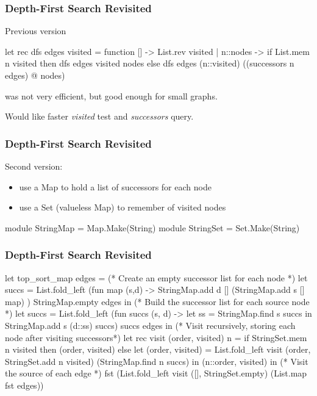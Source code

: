 \documentclass{plt}
\begin{document}
\begin{frame}[fragile]
  \frametitle{Depth-First Search Revisited}

Previous version

\begin{ocaml}
let rec dfs edges visited = function
  []       -> List.rev visited
| n::nodes ->
  if List.mem n visited then
    dfs edges visited nodes
  else
    dfs edges (n::visited) ((successors n edges) @ nodes)
\end{ocaml}

was not very efficient, but good enough for small graphs.

Would like faster \emph{visited} test and \emph{successors} query.

\end{frame}

\begin{frame}[fragile]
  \frametitle{Depth-First Search Revisited}

Second version:

\begin{itemize}
\item use a Map to hold a list of successors for each node
\item use a Set (valueless Map) to remember of visited nodes
\end{itemize}

\begin{ocaml}
module StringMap = Map.Make(String)
module StringSet = Set.Make(String)
\end{ocaml}

\end{frame}



\begin{frame}[fragile]
  \frametitle{Depth-First Search Revisited}


\begin{ocaml}
let top_sort_map edges =
  (* Create an empty successor list for each node *)
  let succs = List.fold_left
      (fun map (s,d) ->
        StringMap.add d [] (StringMap.add s [] map)
      ) StringMap.empty edges
  in (* Build the successor list for each source node *)
  let succs = List.fold_left
      (fun succs (s, d) ->
        let ss = StringMap.find s succs
        in StringMap.add s (d::ss) succs) succs edges
  in 
  (* Visit recursively, storing each node after visiting successors*)
  let rec visit (order, visited) n =
    if StringSet.mem n visited then
      (order, visited)
    else  let (order, visited) = List.fold_left
              visit (order, StringSet.add n visited)
              (StringMap.find n succs)
          in (n::order, visited)
  in (* Visit the source of each edge *)
  fst (List.fold_left visit ([], StringSet.empty) 
                            (List.map fst edges))
\end{ocaml}

\end{frame}
\end{document}
